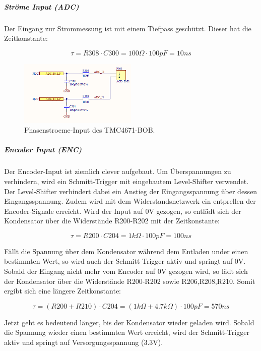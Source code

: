 \newpage

\subparagraph{Ströme Input (ADC)}

Der Eingang zur Strommessung ist mit einem Tiefpass geschützt. Dieser hat die Zeitkonstante:

\begin{equation}
\tau = R308 \cdot C300 = 100\Omega \cdot 100pF = 10ns
\end{equation}

\begin{figure}[h!]
	\centering
	\includegraphics[width=0.5\textwidth]{graphics/TMC4671_Phasenstroeme_BOB_Schematic}
	\caption{Phasenstroeme-Input des TMC4671-BOB.}
	\label{fig:Schema_Phasenstroeme_FOC_Treiber}
\end{figure} 

\subparagraph{Encoder Input (ENC)}

Der Encoder-Input ist ziemlich clever aufgebaut. Um Überspannungen zu verhindern, wird ein Schmitt-Trigger mit eingebautem Level-Shifter verwendet. Der Level-Shifter verhindert dabei ein Anstieg der Eingangsspannung über dessen Eingangsspannung.
Zudem wird mit dem Widerstandsnetzwerk ein entprellen der Encoder-Signale erreicht. Wird der Input auf 0V gezogen, so entlädt sich der Kondensator über die Widerstände R200-R202 mit der Zeitkonstante:

\begin{equation}
\tau = R200 \cdot C204 = 1k\Omega \cdot 100pF = 100ns
\end{equation}

Fällt die Spannung über dem Kondensator während dem Entladen under einen bestimmten Wert, so wird auch der Schmitt-Trigger aktiv und springt auf 0V. Sobald der Eingang nicht mehr vom Encoder auf 0V gezogen wird, so lädt sich der Kondensator über die Widerstände R200-R202 sowie R206,R208,R210. Somit ergibt sich eine längere Zeitkonstante:

\begin{equation}
\tau = (R200 + R210) \cdot C204 = (1k\Omega + 4.7k\Omega) \cdot 100pF = 570ns
\end{equation}

Jetzt geht es bedeutend länger, bis der Kondensator wieder geladen wird. Sobald die Spannung wieder einen bestimmten Wert erreicht, wird der Schmitt-Trigger aktiv und springt auf Versorgungsspannung (3.3V).

